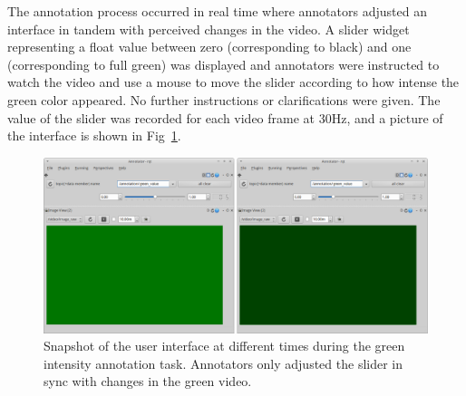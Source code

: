 \documentclass[10pt,letterpaper]{article}
\def \imagewidth {7.5in}
\begin{document}
The annotation process occurred in real time where annotators adjusted an interface in tandem with perceived changes in the video.  A slider widget representing a float value between zero (corresponding to black) and one (corresponding to full green) was displayed and annotators were instructed to watch the video and use a mouse to move the slider according to how intense the green color appeared.  No further instructions or clarifications were given. The value of the slider was recorded for each video frame at 30Hz, and a picture of the interface is shown in Fig~\ref{Fig:annotation_ui}.

\begin{figure}[t]
    \begin{adjustwidth}{-2.25in}{0in}
	\centering
	\includegraphics[width=\imagewidth]{images/green_ui.eps}
	\caption{Snapshot of the user interface at different times during the green intensity annotation task.  Annotators only adjusted the slider in sync with changes in the green video.}
	\label{Fig:annotation_ui}
	\end{adjustwidth}
\end{figure}
\end{document}
